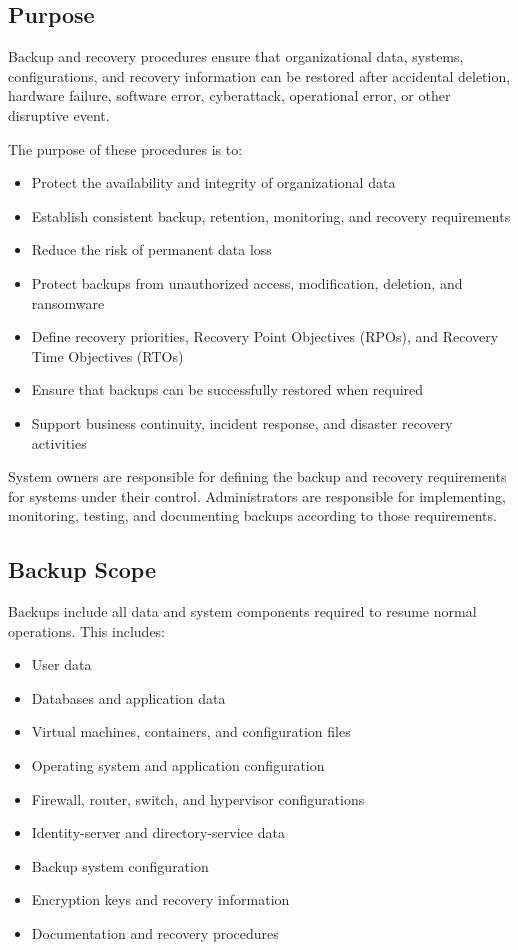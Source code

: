 \subsection{Purpose}

Backup and recovery procedures ensure that organizational data, systems, configurations, and recovery information can be restored after accidental deletion, hardware failure, software error, cyberattack, operational error, or other disruptive event.

The purpose of these procedures is to:

\begin{itemize}
    \item Protect the availability and integrity of organizational data
    \item Establish consistent backup, retention, monitoring, and recovery requirements
    \item Reduce the risk of permanent data loss
    \item Protect backups from unauthorized access, modification, deletion, and ransomware
    \item Define recovery priorities, Recovery Point Objectives (RPOs), and Recovery Time Objectives (RTOs)
    \item Ensure that backups can be successfully restored when required
    \item Support business continuity, incident response, and disaster recovery activities
\end{itemize}

System owners are responsible for defining the backup and recovery requirements for systems under their control. Administrators are responsible for implementing, monitoring, testing, and documenting backups according to those requirements.

\subsection{Backup Scope}

Backups \must{} include all data and system components required to resume normal operations. This includes:
\begin{itemize}
    \item User data
    \item Databases and application data
    \item Virtual machines, containers, and configuration files
    \item Operating system and application configuration
    \item Firewall, router, switch, and hypervisor configurations
    \item Identity-server and directory-service data
    \item Backup system configuration
    \item Encryption keys and recovery information
    \item Documentation and recovery procedures
\end{itemize}

